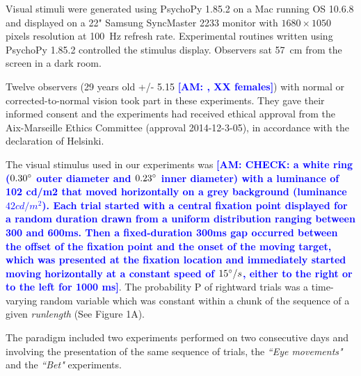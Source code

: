 \documentclass[12pt,english]{article}%
\newcommand{\AM}[1]{\textbf{\textcolor{blue}{[AM: #1]}}}
\begin{document}

Visual stimuli were generated using PsychoPy 1.85.2 on a Mac running OS 10.6.8 and displayed on a 22" Samsung SyncMaster 2233 monitor with $1680\times 1050$ pixels resolution at 100~\si{\Hz} refresh rate. Experimental routines written using PsychoPy 1.85.2 controlled the stimulus display. Observers sat 57~\si{\cm} from the screen in a dark room. 

Twelve observers (29 years old +/- 5.15 \AM{, XX females}) with normal or corrected-to-normal vision took part in these experiments. They gave their informed consent and the experiments had received ethical approval from the Aix-Marseille Ethics Committee (approval 2014-12-3-05), in accordance with the declaration of Helsinki.


The visual stimulus used in our experiments was \AM{CHECK: a white ring ($0.30\degree$ outer diameter and $0.23\degree$ inner diameter) with a luminance of 102 cd/m2 that moved horizontally on a grey background (luminance $42cd/m^2$). Each trial started with a central fixation point displayed for a random duration drawn from a uniform distribution ranging between 300 and 600ms. Then a fixed-duration 300ms gap occurred between the offset of the fixation point and the onset of the moving target, which was presented at the fixation location and immediately started moving horizontally at a constant speed of $15\degree/s$, either to the right or to the left for 1000 ms}. The probability P of rightward trials was a time-varying random variable which was constant within a chunk of the sequence of a given \textit{runlength} (See Figure 1A). 

The paradigm included two experiments performed on two consecutive days and involving the presentation of the same sequence of trials, the \textit{ ``Eye movements"} and the \textit{ ``Bet"} experiments.
\end{document}
